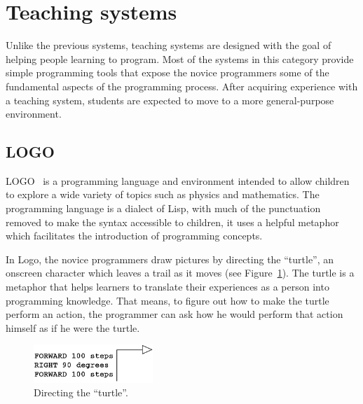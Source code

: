 \section{Teaching systems}
\label{sec:ts}
Unlike the previous systems, teaching systems are designed with the goal of helping people learning to program. Most of the systems in this category provide simple programming tools that expose the novice programmers some of the fundamental aspects of the programming process. After acquiring experience with a teaching system, students are expected to move to a more general-purpose environment. 

\subsection{LOGO} 
\label{subsec:logo}
LOGO~\citep{papert1980mindstorms} is a programming language and environment intended to allow children to explore a wide variety of topics such as physics and mathematics. The programming language is a dialect of Lisp, with much of the punctuation removed to make the syntax accessible to children, it uses a helpful metaphor which facilitates the introduction of programming concepts.

In Logo, the novice programmers draw pictures by directing the ``turtle'', an onscreen character which leaves a trail as it moves (see Figure~\ref{fig:turtle}). The turtle is a metaphor that helps learners to translate their experiences as a person into programming knowledge. That means, to figure out how to make the turtle perform an action, the programmer can ask how he would perform that action himself as if he were the turtle.

\begin{figure}
  \begin{center}
    \includegraphics[width=0.4\textwidth]{images/turtle}
  \end{center}
 \caption{Directing the ``turtle''.}  
    \label{fig:turtle}
\end{figure}


